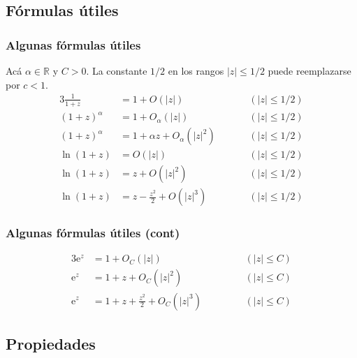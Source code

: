 \documentclass[english, spanish, fleqn,%
hyperref = {colorlinks, urlcolor = blue}%
]{beamer}
\begin{document}
\subsection{Fórmulas útiles}

\begin{frame}
  \frametitle{Algunas fórmulas útiles}

  Acá \(\alpha \in \mathbb{R}\)
  y \(C > 0\).
  La constante \(1/2\) en los rangos \(\lvert z \rvert \le 1/2\)
  puede reemplazarse por \(c < 1\).
  \begin{alignat*}{3}
    \frac{1}{1 + z}
       &= 1 + O(\lvert z \rvert)
       &&\quad& (\lvert z \rvert \le 1/2) \\
    (1 + z)^\alpha
       &= 1 + O_\alpha(\lvert z \rvert)
       &&& (\lvert z \rvert \le 1/2) \\
    (1 + z)^\alpha
       &= 1 + \alpha z + O_\alpha(\lvert z \rvert^2)
       &&& (\lvert z \rvert \le 1/2) \\
    \ln (1 + z)
       &= O(\lvert z \rvert)
       &&& (\lvert z \rvert \le 1/2) \\
    \ln (1 + z)
       &= z + O(\lvert z \rvert^2)
       &&& (\lvert z \rvert \le 1/2) \\
    \ln (1 + z)
       &= z - \frac{z^2}{2} + O(\lvert z \rvert^3)
       &&& (\lvert z \rvert \le 1/2)
  \end{alignat*}
\end{frame}

\begin{frame}
  \frametitle{Algunas fórmulas útiles (cont)}

  \begin{alignat*}{3}
    \mathrm{e}^z
       &= 1 + O_C (\lvert z \rvert)
       &&\qquad& (\lvert z \rvert \le C) \\
    \mathrm{e}^z
       &= 1 + z + O_C (\lvert z \rvert^2)
       &&& (\lvert z \rvert \le C) \\
    \mathrm{e}^z
       &= 1 + z + \frac{z^2}{2} + O_C (\lvert z \rvert^3)
       &&& (\lvert z \rvert \le C)
  \end{alignat*}
\end{frame}

\subsection{Propiedades}
\end{document}
